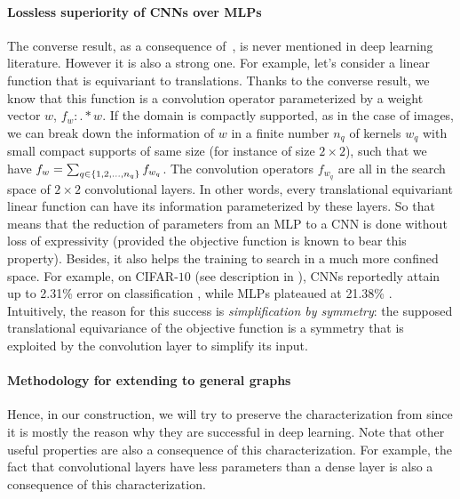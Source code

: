\paragraph{Lossless superiority of CNNs over MLPs}
The converse result, as a consequence of~, is never mentioned in deep learning literature. However it is also a strong one. For example, let's consider a linear function that is equivariant to translations. Thanks to the converse result, we know that this function is a convolution operator parameterized by a weight vector $w$, $f_w : . \ast w$. If the domain is compactly supported, as in the case of images, we can break down the information of $w$ in a finite number $n_q$ of kernels $w_q$  with small compact supports of same size (for instance of size $2 \times 2$), such that we have $f_w = \sum_{q \in \{1, 2, \ldots, n_q\}} f_{w_q}$. The convolution operators $f_{w_q}$ are all in the search space of $2 \times 2$ convolutional layers. In other words, every translational equivariant linear function can have its information parameterized by these layers. So that means that the reduction of parameters from an MLP to a CNN is done without loss of expressivity (provided the objective function is known to bear this property). Besides, it also helps the training to search in a much more confined space. For example, on CIFAR-$10$ (see description in ), CNNs reportedly attain up to 2.31\% error on classification \citep{yamada2018shakedrop}, while MLPs plateaued at 21.38\% \citep{lin2015}. Intuitively, the reason for this success is \emph{simplification by symmetry}: the supposed translational equivariance of the objective function is a symmetry that is exploited by the convolution layer to simplify its input.

\paragraph{Methodology for extending to general graphs}
Hence, in our construction, we will try to preserve the characterization from  since it is mostly the reason why they are successful in deep learning. Note that other useful properties are also a consequence of this characterization. For example, the fact that convolutional layers have less parameters than a dense layer is also a consequence of this characterization.







